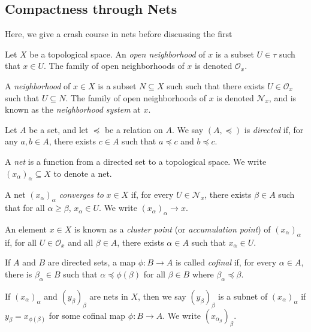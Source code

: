 \documentclass[10pt]{mypackage}
\begin{document}
\subsection{Compactness through Nets}%
Here, we give a crash course in nets before discussing the first 
\begin{definition}
  Let $X$ be a topological space. An \textit{open neighborhood} of $x$ is a subset $U\in \tau$ such that $x\in U$. The family of open neighborhoods of $x$ is denoted $\mathcal{O}_{x}$.\newline

  A \textit{neighborhood} of $x\in X$ is a subset $N\subseteq X$ such such that there exists $U\in \mathcal{O}_{x}$ such that $U\subseteq N$. The family of open neighborhoods of $x$ is denoted $\mathcal{N}_{x}$, and is known as the \textit{neighborhood system} at $x$.
\end{definition}
\begin{definition}
  Let $A$ be a set, and let $\preceq$ be a relation on $A$. We say $\left( A,\preceq \right)$ is \textit{directed} if, for any $a,b\in A$, there exists $c\in A$ such that $a\preceq c$ and $b\preceq c$.
\end{definition}
\begin{definition}
  A \textit{net} is a function from a directed set to a topological space. We write $\left( x_{\alpha} \right)_{\alpha}\subseteq X$ to denote a net.
\end{definition}
\begin{definition}
  A net $\left( x_{\alpha} \right)_{\alpha}$ \textit{converges to} $x\in X$ if, for every $U\in \mathcal{N}_{x}$, there exists $\beta\in A$ such that for all $\alpha \geq \beta$, $x_{\alpha}\in U$. We write $\left( x_{\alpha} \right)_{\alpha}\rightarrow x$.\newline

  An element $x\in X$ is known as a \textit{cluster point} (or \textit{accumulation point}) of $\left( x_{\alpha} \right)_{\alpha}$ if, for all $U\in \mathcal{O}_{x}$ and all $\beta\in A$, there exists $\alpha \in A$ such that $x_{\alpha}\in U$.
\end{definition}
\begin{definition}
  If $A$ and $B$ are directed sets, a map $\phi\colon B\rightarrow A$ is called \textit{cofinal} if, for every $\alpha \in A$, there is $\beta_{\alpha}\in B$ such that $\alpha\preceq \phi\left( \beta \right)$ for all $\beta\in B$ where $\beta_{\alpha}\preceq \beta$.\newline

  If $\left( x_{\alpha} \right)_{\alpha}$ and $\left( y_{\beta} \right)_{\beta}$ are nets in $X$, then we say $\left( y_{\beta} \right)_{\beta}$ is a subnet of $\left( x_{\alpha} \right)_{\alpha}$ if $y_{\beta} = x_{\phi\left( \beta \right)}$ for some cofinal map $\phi\colon B\rightarrow A$. We write $\left( x_{\alpha_{\beta}} \right)_{\beta}$.
\end{definition}
\end{document}
